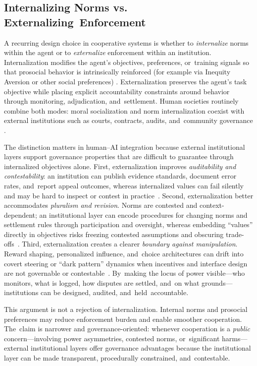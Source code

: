 \documentclass[mca,article,accept,pdftex,oneauthor]{Definitions/mdpi}
\begin{document}
\subsection{Internalizing Norms vs. Externalizing~Enforcement}

A recurring design choice in cooperative systems is whether to \emph{internalize} norms within the agent or to \emph{externalize} enforcement within an institution. Internalization modifies the agent’s objectives, preferences, or~training signals so that prosocial behavior is intrinsically reinforced (for example via Inequity Aversion or other social preferences) \citep{Hughes2018InequityAversion}. Externalization preserves the agent’s task objective while placing explicit accountability constraints around behavior through monitoring, adjudication, and~settlement. Human societies routinely combine both modes: moral socialization and norm internalization coexist with external institutions such as courts, contracts, audits, and~community governance \citep{Ostrom1990}.

The distinction matters in human--AI integration because external institutional layers support governance properties that are difficult to guarantee through internalized objectives alone. First, externalization improves \emph{auditability and contestability}: an institution can publish evidence standards, document error rates, and~report appeal outcomes, whereas internalized values can fail silently and may be hard to inspect or contest in \mbox{practice \citep{Burrell2016Opacity,Raji2020Auditing}.} Second, externalization better accommodates \emph{pluralism and revision}. Norms are contested and context-dependent; an institutional layer can encode procedures for changing norms and settlement rules through participation and oversight, whereas embedding ``values'' directly in objectives risks freezing contested assumptions and obscuring \mbox{trade-offs \citep{Selbst2019FairnessAbstraction,Mittelstadt2019Principles}.} Third, externalization creates a clearer \emph{boundary against manipulation}. Reward shaping, personalized influence, and~choice architectures can drift into covert steering or ``dark pattern'' dynamics when incentives and interface design are not governable or \mbox{contestable \citep{SusserRoesslerNissenbaum2019,Gray2018DarkPatterns}.} By~making the locus of power visible---who monitors, what is logged, how disputes are settled, and~on what grounds---institutions can be designed, audited, and~held~accountable.

This argument is not a rejection of internalization. Internal norms and prosocial preferences may reduce enforcement burden and enable smoother cooperation. The~claim is narrower and governance-oriented: whenever cooperation is a \emph{public} concern---involving power asymmetries, contested norms, or~significant harms---external institutional layers offer governance advantages because the institutional layer can be made transparent, procedurally constrained, and~contestable.
\end{document}

